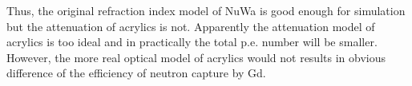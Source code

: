 

Thus, the original refraction index model of NuWa is good enough for simulation but the attenuation of acrylics is not.
Apparently the attenuation model of acrylics is too ideal and in practically the total p.e. number will be smaller.
However, the more real optical model of acrylics would not results in obvious difference of the efficiency of neutron capture by Gd.

